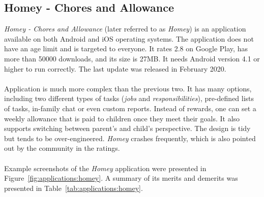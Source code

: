 \subsection{Homey - Chores and Allowance}\label{subsec:market:solutions:homey}
\textit{Homey - Chores and Allowance} \cite{HomeyChoresAllowance,HomeyChoresAllowancea} (later referred to as \textit{Homey}) is an application available on both Android and iOS operating systems. The application does not have an age limit and is targeted to everyone. It rates 2.8 on Google Play, has more than 50000 downloads, and its size is 27MB. It needs Android version 4.1 or higher to run correctly. The last update was released in February 2020.
\\\\
Application is much more complex than the previous two. It has many options, including two different types of tasks (\textit{jobs} and \textit{responsibilities}), pre-defined lists of tasks, in-family chat or even custom reports. Instead of rewards, one can set a weekly allowance that is paid to children once they meet their goals. It also supports switching between parent's and child's perspective. The design is tidy but tends to be over-engineered. \textit{Homey} crashes frequently, which is also pointed out by the community in the ratings.
\\\\
Example screenshots of the \textit{Homey} application were presented in Figure~\ref{fig:applications:homey}. A summary of its merits and demerits was presented in Table~\ref{tab:applications:homey}.
\\



